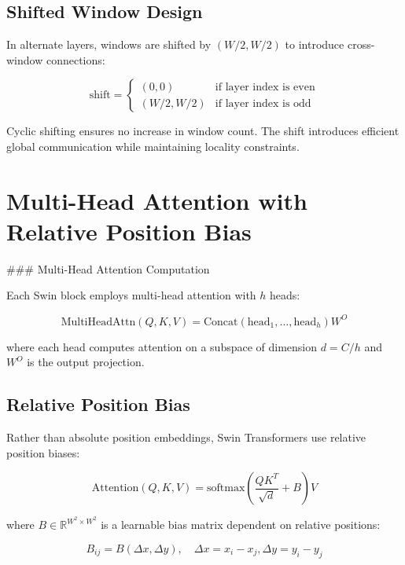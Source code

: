 \subsection{Shifted Window Design}

In alternate layers, windows are shifted by $(W/2, W/2)$ to introduce cross-window connections:

\begin{equation}
\text{shift} = \begin{cases}
(0, 0) & \text{if layer index is even} \\
(W/2, W/2) & \text{if layer index is odd}
\end{cases}
\end{equation}

Cyclic shifting ensures no increase in window count. The shift introduces efficient global communication while maintaining locality constraints.

\section{Multi-Head Attention with Relative Position Bias}

### Multi-Head Attention Computation

Each Swin block employs multi-head attention with $h$ heads:

\begin{equation}
\text{MultiHeadAttn}(Q, K, V) = \text{Concat}(\text{head}_1, \ldots, \text{head}_h)W^O
\end{equation}

where each head computes attention on a subspace of dimension $d = C/h$ and $W^O$ is the output projection.

\subsection{Relative Position Bias}

Rather than absolute position embeddings, Swin Transformers use relative position biases:

\begin{equation}
\text{Attention}(Q, K, V) = \text{softmax}\left(\frac{QK^T}{\sqrt{d}} + B\right)V
\end{equation}

where $B \in \mathbb{R}^{W^2 \times W^2}$ is a learnable bias matrix dependent on relative positions:

\begin{equation}
B_{ij} = B(\Delta x, \Delta y), \quad \Delta x = x_i - x_j, \Delta y = y_i - y_j
\end{equation}

